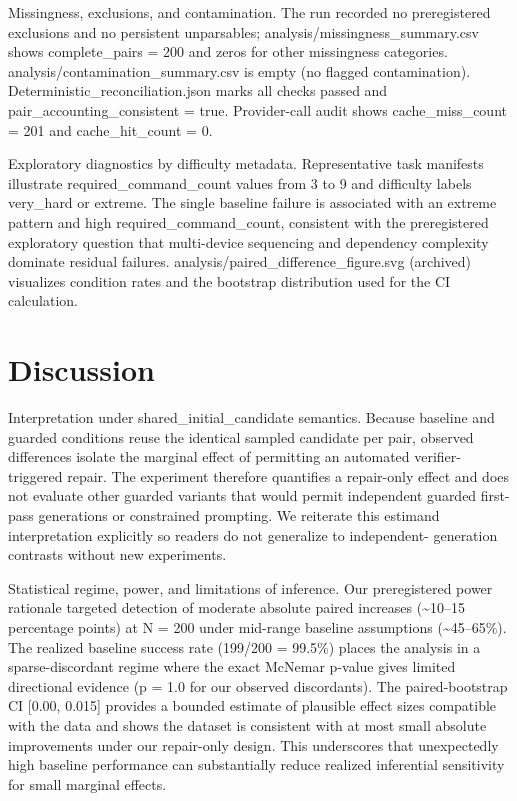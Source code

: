 \documentclass[conference]{IEEEtran}
\begin{document}
Missingness, exclusions, and contamination. The run recorded no preregistered exclusions and no persistent unparsables; analysis/missingness\_summary.csv shows complete\_pairs = 200 and zeros for other missingness categories. analysis/contamination\_summary.csv is empty (no flagged contamination). Deterministic\_reconciliation.json marks all checks passed and pair\_accounting\_consistent = true. Provider-call audit shows cache\_miss\_count = 201 and cache\_hit\_count = 0.

Exploratory diagnostics by difficulty metadata. Representative task manifests illustrate required\_command\_count values from 3 to 9 and difficulty labels very\_hard or extreme. The single baseline failure is associated with an extreme pattern and high required\_command\_count, consistent with the preregistered exploratory question that multi-device sequencing and dependency complexity dominate residual failures. analysis/paired\_difference\_figure.svg (archived) visualizes condition rates and the bootstrap distribution used for the CI calculation.

\section{Discussion}
Interpretation under shared\_initial\_candidate semantics. Because baseline and guarded conditions reuse the identical sampled candidate per pair, observed differences isolate the marginal effect of permitting an automated verifier-triggered repair. The experiment therefore quantifies a repair-only effect and does not evaluate other guarded variants that would permit independent guarded first-pass generations or constrained prompting. We reiterate this estimand interpretation explicitly so readers do not generalize to independent- generation contrasts without new experiments.

Statistical regime, power, and limitations of inference. Our preregistered power rationale targeted detection of moderate absolute paired increases (\textasciitilde{}10--15 percentage points) at N = 200 under mid-range baseline assumptions (\textasciitilde{}45--65\%). The realized baseline success rate (199/200 = 99.5\%) places the analysis in a sparse-discordant regime where the exact McNemar p-value gives limited directional evidence (p = 1.0 for our observed discordants). The paired-bootstrap CI [0.00, 0.015] provides a bounded estimate of plausible effect sizes compatible with the data and shows the dataset is consistent with at most small absolute improvements under our repair-only design. This underscores that unexpectedly high baseline performance can substantially reduce realized inferential sensitivity for small marginal effects.
\end{document}
